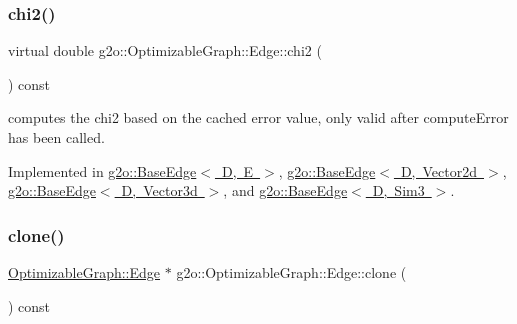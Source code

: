 \mbox{\label{classg2o_1_1_optimizable_graph_1_1_edge_a182bd2c109d50283c638d9b295f2f3d7}} 
\subsubsection{\texorpdfstring{chi2()}{chi2()}}
{\footnotesize\ttfamily virtual double g2o\+::\+Optimizable\+Graph\+::\+Edge\+::chi2 (\begin{DoxyParamCaption}{ }\end{DoxyParamCaption}) const\hspace{0.3cm}{\ttfamily [pure virtual]}}



computes the chi2 based on the cached error value, only valid after compute\+Error has been called. 



Implemented in \mbox{\hyperlink{classg2o_1_1_base_edge_a8316137ded4396a2dbf7529d83888400}{g2o\+::\+Base\+Edge$<$ D, E $>$}}, \mbox{\hyperlink{classg2o_1_1_base_edge_a8316137ded4396a2dbf7529d83888400}{g2o\+::\+Base\+Edge$<$ D, Vector2d $>$}}, \mbox{\hyperlink{classg2o_1_1_base_edge_a8316137ded4396a2dbf7529d83888400}{g2o\+::\+Base\+Edge$<$ D, Vector3d $>$}}, and \mbox{\hyperlink{classg2o_1_1_base_edge_a8316137ded4396a2dbf7529d83888400}{g2o\+::\+Base\+Edge$<$ D, Sim3 $>$}}.

\mbox{\label{classg2o_1_1_optimizable_graph_1_1_edge_a1a238c63bc8a799ada3ac5712e13315e}} 
\subsubsection{\texorpdfstring{clone()}{clone()}}
{\footnotesize\ttfamily \mbox{\hyperlink{classg2o_1_1_optimizable_graph_1_1_edge}{Optimizable\+Graph\+::\+Edge}} $\ast$ g2o\+::\+Optimizable\+Graph\+::\+Edge\+::clone (\begin{DoxyParamCaption}{ }\end{DoxyParamCaption}) const\hspace{0.3cm}{\ttfamily [virtual]}}

